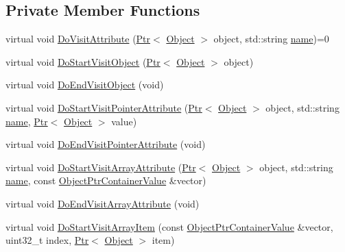 \subsection*{Private Member Functions}
\begin{DoxyCompactItemize}
\item 
virtual void \hyperlink{classns3_1_1AttributeIterator_a6e4a614634b16fbdddd1d472928b5c12}{Do\+Visit\+Attribute} (\hyperlink{classns3_1_1Ptr}{Ptr}$<$ \hyperlink{classns3_1_1Object}{Object} $>$ object, std\+::string \hyperlink{generate__test__data__lte__spectrum__model_8m_ab74e6bf80237ddc4109968cedc58c151}{name})=0
\item 
virtual void \hyperlink{classns3_1_1AttributeIterator_ad2f91f9e3802a20e25a2c7e4dccc442d}{Do\+Start\+Visit\+Object} (\hyperlink{classns3_1_1Ptr}{Ptr}$<$ \hyperlink{classns3_1_1Object}{Object} $>$ object)
\item 
virtual void \hyperlink{classns3_1_1AttributeIterator_af0cf05d44b7fc7dce0151137f141fd5a}{Do\+End\+Visit\+Object} (void)
\item 
virtual void \hyperlink{classns3_1_1AttributeIterator_a101dfcfe4d049b247af9bc6be2b0e76e}{Do\+Start\+Visit\+Pointer\+Attribute} (\hyperlink{classns3_1_1Ptr}{Ptr}$<$ \hyperlink{classns3_1_1Object}{Object} $>$ object, std\+::string \hyperlink{generate__test__data__lte__spectrum__model_8m_ab74e6bf80237ddc4109968cedc58c151}{name}, \hyperlink{classns3_1_1Ptr}{Ptr}$<$ \hyperlink{classns3_1_1Object}{Object} $>$ value)
\item 
virtual void \hyperlink{classns3_1_1AttributeIterator_a1d8887c8a7283f8c09539571809dbe65}{Do\+End\+Visit\+Pointer\+Attribute} (void)
\item 
virtual void \hyperlink{classns3_1_1AttributeIterator_aee1c22a578b81f11e10342465e1ba424}{Do\+Start\+Visit\+Array\+Attribute} (\hyperlink{classns3_1_1Ptr}{Ptr}$<$ \hyperlink{classns3_1_1Object}{Object} $>$ object, std\+::string \hyperlink{generate__test__data__lte__spectrum__model_8m_ab74e6bf80237ddc4109968cedc58c151}{name}, const \hyperlink{classns3_1_1ObjectPtrContainerValue}{Object\+Ptr\+Container\+Value} \&vector)
\item 
virtual void \hyperlink{classns3_1_1AttributeIterator_a0969a536eedefb669cd183f5a6158637}{Do\+End\+Visit\+Array\+Attribute} (void)
\item 
virtual void \hyperlink{classns3_1_1AttributeIterator_ac421482976fe8c0b4c50ec8ef926411a}{Do\+Start\+Visit\+Array\+Item} (const \hyperlink{classns3_1_1ObjectPtrContainerValue}{Object\+Ptr\+Container\+Value} \&vector, uint32\+\_\+t index, \hyperlink{classns3_1_1Ptr}{Ptr}$<$ \hyperlink{classns3_1_1Object}{Object} $>$ item)

\end{DoxyCompactItemize}
